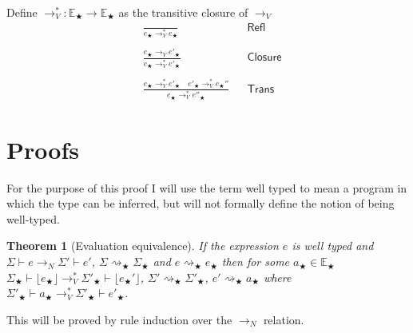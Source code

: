 \documentclass[float=false, crop=false]{standalone}
\newtheorem{theorem}{Theorem}
\numberwithin{subcase}{case}
\newcommand{\tlang}{\bigstar}
\newcommand{\unwrap}[1]{\lfloor #1 \rfloor}
\newcommand{\tcbn}{\rightarrow_N}
\newcommand{\tcbv}{\rightarrow_V}
\newcommand{\tccbv}{\rightarrow_V^*}
\newcommand{\tlthunk}{\rightsquigarrow_\tlang}
\begin{document}
Define $\tccbv: \mathbb{E}_\tlang \rightarrow \mathbb{E}_\tlang$ as the transitive closure of $\tcbv$
\begin{align*}
  &\frac{}{e_\tlang \tccbv e_\tlang} && \mathsf{Refl}\\ \\
  &\frac{e_\tlang \tcbv e'_\tlang}{e_\tlang \tccbv e'_\tlang} 
    && \mathsf{Closure}\\ \\
  &\frac{e_\tlang \tccbv e'_\tlang \quad e'_\tlang \tccbv e_\tlang'' }{e_\tlang \tccbv e''_\tlang} && \mathsf{Trans}
\end{align*}

\section{Proofs}

For the purpose of this proof I will use the term well typed to mean a program in which the 
type can be inferred, but will not formally define the notion of being well-typed.

\begin{theorem}[Evaluation equivalence]
If the expression $e$ is well typed and
\mbox{$\Sigma \vdash e \tcbn \Sigma' \vdash e'$}, $\Sigma \tlthunk \Sigma_\tlang$ and \mbox{$e \tlthunk e_\tlang$} 
then for some $a_\tlang \in \mathbb{E}_\tlang$ 
\mbox{$\Sigma_\tlang \vdash \unwrap{e_\tlang}\tccbv \Sigma'_\tlang \vdash \unwrap{e_\tlang'}$},
\mbox{$\Sigma' \tlthunk \Sigma'_\tlang$}, \mbox{$e' \tlthunk a_\tlang$} where 
\mbox{$\Sigma'_\tlang \vdash a_\tlang \tccbv \Sigma'_\tlang \vdash  e'_\tlang$}.
\end{theorem}



This will be proved by rule induction over the $\tcbn$ relation. 
\end{document}
